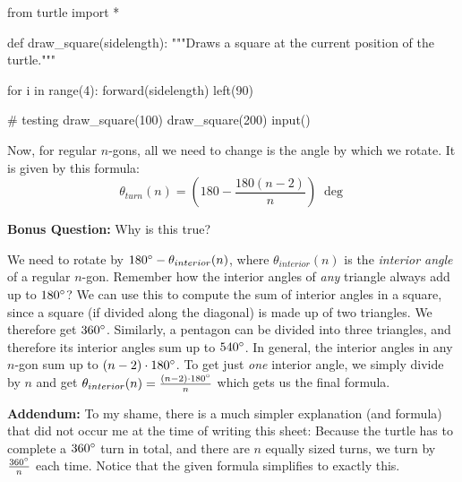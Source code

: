 \begin{solution}
    \begin{pythoncode}
from turtle import *

def draw_square(sidelength):
    """Draws a square at the current position of the turtle."""

    for i in range(4):
        forward(sidelength)
        left(90)

# testing
draw_square(100)
draw_square(200)
input()
    \end{pythoncode}
\end{solution}

\vspace{1em}

\noindent Now, for regular $n$-gons, all we need to change is the angle by which we rotate. It is given by this formula:
$$ \theta_{turn}(n) = \left(180 - \frac{180 (n - 2)}{n} \right) \; \deg $$

\noindent \textbf{Bonus Question:} Why is this true?

\vspace{1em}

\begin{solution}
    We need to rotate by $180 \degree - \theta_{interior}(n)$, where $\theta_{interior}(n)$ is the \textit{interior angle} of a regular $n$-gon. Remember how the interior angles of \textit{any} triangle always add up to $180 \degree$? We can use this to compute the sum of interior angles in a square, since a square (if divided along the diagonal) is made up of two triangles. We therefore get $360 \degree$. Similarly, a pentagon can be divided into three triangles, and therefore its interior angles sum up to $540 \degree$. In general, the interior angles in any $n$-gon sum up to $(n-2) \cdot 180 \degree$. To get just \textit{one} interior angle, we simply divide by $n$ and get $\theta_{interior}(n) = \frac{(n-2) \cdot 180 \degree }{n}$ which gets us the final formula.

    \vspace{1em}

    \noindent \textbf{Addendum:} To my shame, there is a much simpler explanation (and formula) that did not occur me at the time of writing this sheet: Because the turtle has to complete a $360 \degree$ turn in total, and there are $n$ equally sized turns, we turn by $\frac{360\degree}{n}$ each time. Notice that the given formula simplifies to exactly this.
\end{solution}

\vspace{1em}

